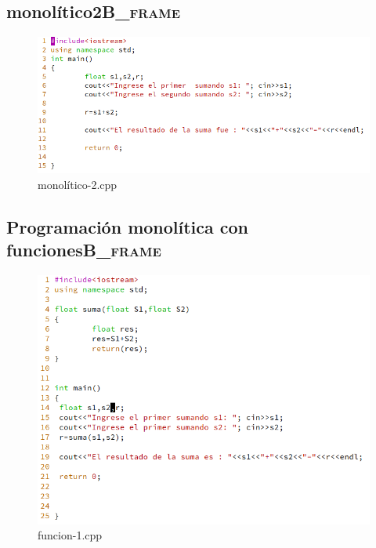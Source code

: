 \documentclass[presentation, aspectratio=54]{beamer}
\begin{document}
\subsection{monolítico2\hfill{}\textsc{B\_frame}}
\label{sec:org4912356}
\begin{figure}[htbp]
\centering
\includegraphics[width=1.1\linewidth]{./images/codigo/monolitico-2.png}
monolítico-2.cpp
\end{figure}
\subsection{Programación monolítica con funciones\hfill{}\textsc{B\_frame}}
\label{sec:org957c539}
\begin{figure}[htbp]
\centering
\includegraphics[width=.9\linewidth]{./images/codigo/funcion1.png}
funcion-1.cpp
\end{figure}
\end{document}
